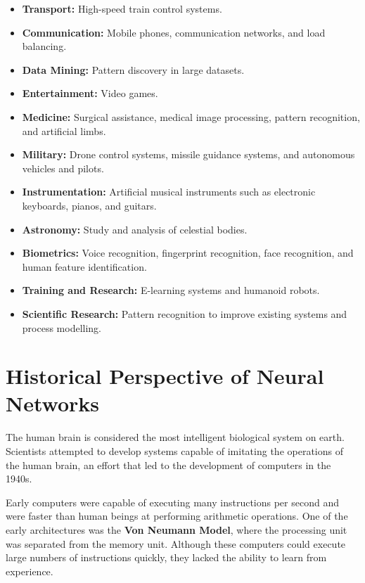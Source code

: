 \documentclass[12pt,a4paper]{article}
\begin{document}
\begin{itemize}
    \item \textbf{Transport:} High-speed train control systems.
    \item \textbf{Communication:} Mobile phones, communication networks, and load balancing.
    \item \textbf{Data Mining:} Pattern discovery in large datasets.
    \item \textbf{Entertainment:} Video games.
    \item \textbf{Medicine:} Surgical assistance, medical image processing, pattern recognition, and artificial limbs.
    \item \textbf{Military:} Drone control systems, missile guidance systems, and autonomous vehicles and pilots.
    \item \textbf{Instrumentation:} Artificial musical instruments such as electronic keyboards, pianos, and guitars.
    \item \textbf{Astronomy:} Study and analysis of celestial bodies.
    \item \textbf{Biometrics:} Voice recognition, fingerprint recognition, face recognition, and human feature identification.
    \item \textbf{Training and Research:} E-learning systems and humanoid robots.
    \item \textbf{Scientific Research:} Pattern recognition to improve existing systems and process modelling.
\end{itemize}

\section{Historical Perspective of Neural Networks}

The human brain is considered the most intelligent biological system on earth. Scientists attempted to develop systems capable of imitating the operations of the human brain, an effort that led to the development of computers in the 1940s.

Early computers were capable of executing many instructions per second and were faster than human beings at performing arithmetic operations. One of the early architectures was the \textbf{Von Neumann Model}, where the processing unit was separated from the memory unit. Although these computers could execute large numbers of instructions quickly, they lacked the ability to learn from experience.
\end{document}
